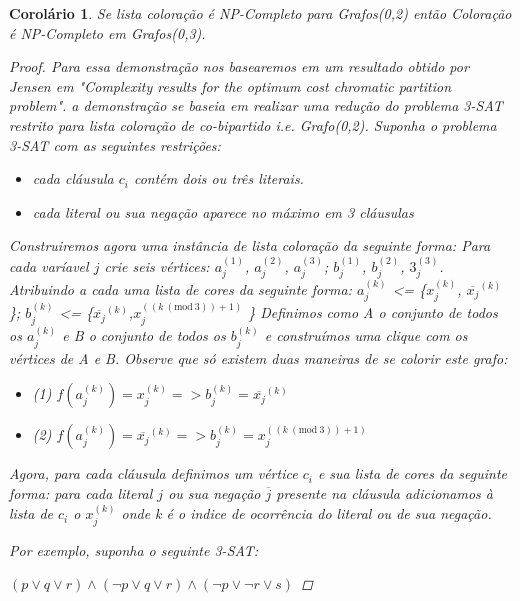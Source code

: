 \documentclass[a4paper,11pt]{article}
\newtheorem{corolario}{Corolário}
\newcommand{\Mod}[1]{\ (\mathrm{mod}\ #1)}
\begin{document}
    \begin{corolario}
    Se lista coloração é NP-Completo para Grafos(0,2) então Coloração é NP-Completo em Grafos(0,3).
    \begin{proof}
    Para essa demonstração nos basearemos em um resultado obtido por Jensen em "Complexity results for the optimum cost chromatic partition problem". a demonstração se baseia em realizar uma redução do problema 3-SAT restrito para lista coloração de co-bipartido i.e. Grafo(0,2).
    Suponha o problema 3-SAT com as seguintes restrições:
    \begin{itemize}
      \item cada cláusula $c_i$ contém dois ou três literais.
      \item cada literal ou sua negação aparece no máximo em 3 cláusulas
    \end{itemize}
    Construiremos agora uma instância de lista coloração da seguinte forma:\newline
    Para cada varíavel $j$ crie seis vértices:
    $a_j^{(1)}$, $a_j^{(2)}$, $a_j^{(3)}$;
    $b_j^{(1)}$, $b_j^{(2)}$, $3_j^{(3)}$. Atribuindo a cada uma lista de cores da seguinte forma:\newline
    $a_j^{(k)}$ <= \{$x_j^{(k)}$, $\overline{x_j}^{(k)}$ \}; $b_j^{(k)}$ <= \{$\overline{x_j}^{(k)}$,$x_j^{((k \Mod{3}) + 1 )}$ \}\newline
    Definimos como A o conjunto de todos os $a_j^{(k)}$ e B o conjunto de todos os $b_j^{(k)}$ e construímos uma clique com os vértices de A e B. Observe que só existem duas maneiras de se colorir este grafo:
    \begin{itemize}
      \item (1)  $f(a_j^{(k)}) = x_j^{(k)} => b_j^{(k)} = \overline{x_j}^{(k)}$
      \item (2)  $f(a_j^{(k)}) = \overline{x_j}^{(k)} => b_j^{(k)} = x_j^{((k \Mod{3}) + 1 )}$
    \end{itemize}
    Agora, para cada cláusula definimos um vértice $c_i$ e sua lista de cores da seguinte forma: para cada literal $j$ ou sua negação $\overline{j}$ presente na cláusula adicionamos à lista de $c_i$ o $x_j^{(k)}$ onde k é o indice de ocorrência do literal ou de sua negação.
    
    Por exemplo, suponha o seguinte 3-SAT:
    
    $(p \lor q \lor r) \land (\neg{p} \lor q \lor r) \land (\neg{p} \lor \neg{r} \lor s)$
    

\end{proof}
\end{corolario}
\end{document}
